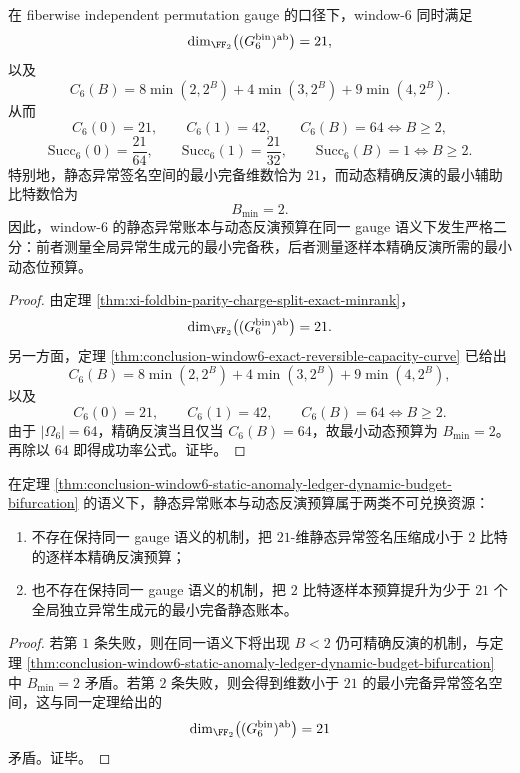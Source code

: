 \begin{theorem}\label{thm:conclusion-window6-static-anomaly-ledger-dynamic-budget-bifurcation}
在 fiberwise independent permutation gauge 的口径下，window-\(6\) 同时满足
\[
\dim_{\FF_2}\bigl((G_6^{\mathrm{bin}})^{\mathrm{ab}}\bigr)=21,
\]
以及
\[
C_6(B)=8\min(2,2^B)+4\min(3,2^B)+9\min(4,2^B).
\]
从而
\[
C_6(0)=21,\qquad C_6(1)=42,\qquad C_6(B)=64\iff B\ge 2,
\]
\[
\mathrm{Succ}_6(0)=\frac{21}{64},\qquad
\mathrm{Succ}_6(1)=\frac{21}{32},\qquad
\mathrm{Succ}_6(B)=1\iff B\ge 2.
\]
特别地，静态异常签名空间的最小完备维数恰为 \(21\)，而动态精确反演的最小辅助比特数恰为
\[
B_{\min}=2.
\]
因此，window-\(6\) 的静态异常账本与动态反演预算在同一 gauge 语义下发生严格二分：前者测量全局异常生成元的最小完备秩，后者测量逐样本精确反演所需的最小动态位预算。
\end{theorem}
\begin{proof}
由定理 \ref{thm:xi-foldbin-parity-charge-split-exact-minrank}，
\[
\dim_{\FF_2}\bigl((G_6^{\mathrm{bin}})^{\mathrm{ab}}\bigr)=21.
\]
另一方面，定理 \ref{thm:conclusion-window6-exact-reversible-capacity-curve} 已给出
\[
C_6(B)=8\min(2,2^B)+4\min(3,2^B)+9\min(4,2^B),
\]
以及
\[
C_6(0)=21,\qquad C_6(1)=42,\qquad C_6(B)=64\iff B\ge 2.
\]
由于 \(|\Omega_6|=64\)，精确反演当且仅当 \(C_6(B)=64\)，故最小动态预算为 \(B_{\min}=2\)。再除以 \(64\) 即得成功率公式。证毕。
\end{proof}

\begin{corollary}[静态二十一维账本与动态二比特预算不可互换]\label{cor:conclusion-window6-static-dynamic-resources-nonexchangeable}
在定理 \ref{thm:conclusion-window6-static-anomaly-ledger-dynamic-budget-bifurcation} 的语义下，静态异常账本与动态反演预算属于两类不可兑换资源：
\begin{enumerate}
  \item 不存在保持同一 gauge 语义的机制，把 \(21\)-维静态异常签名压缩成小于 \(2\) 比特的逐样本精确反演预算；
  \item 也不存在保持同一 gauge 语义的机制，把 \(2\) 比特逐样本预算提升为少于 \(21\) 个全局独立异常生成元的最小完备静态账本。
\end{enumerate}
\end{corollary}
\begin{proof}
若第 \(1\) 条失败，则在同一语义下将出现 \(B<2\) 仍可精确反演的机制，与定理 \ref{thm:conclusion-window6-static-anomaly-ledger-dynamic-budget-bifurcation} 中 \(B_{\min}=2\) 矛盾。若第 \(2\) 条失败，则会得到维数小于 \(21\) 的最小完备异常签名空间，这与同一定理给出的
\[
\dim_{\FF_2}\bigl((G_6^{\mathrm{bin}})^{\mathrm{ab}}\bigr)=21
\]
矛盾。证毕。
\end{proof}

